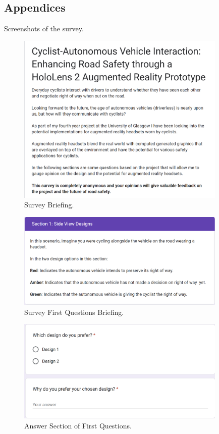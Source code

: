 \documentclass{l4proj}
\begin{document}
%
% 

\begin{appendices}

\chapter{Appendices}

Screenshots of the survey.

\begin{figure}[H]
    \centering
    \includegraphics[width=10cm]{images/survey1.png}
    \caption{Survey Briefing.}
    \label{fig:survey1}
\end{figure}

\begin{figure}[H]
    \centering
    \includegraphics[width=10cm]{images/survey2.png}
    \caption{Survey First Questions Briefing.}
    \label{fig:survey2}
\end{figure}

\begin{figure}[H]
    \centering
    \includegraphics[width=10cm]{images/survey3.png}
    \caption{Answer Section of First Questions.}
    \label{fig:survey3}
\end{figure}


\end{appendices}
\end{document}
